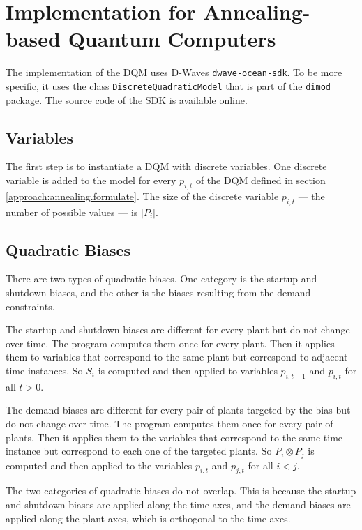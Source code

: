 \section{Implementation for Annealing-based Quantum Computers}

The implementation of the DQM uses D-Waves \texttt{dwave-ocean-sdk}.
\cite{OceanSDKDoc}
To be more specific, it uses the class \texttt{DiscreteQuadraticModel} that is part of the \texttt{dimod} package.
\cite{DQMDoc}
The source code of the SDK is available online.
\cite{OceanSDKGit}

\subsection*{Variables}

The first step is to instantiate a DQM with discrete variables.
One discrete variable is added to the model for every $p_{i, t}$ of the DQM defined in section \ref{approach:annealing.formulate}.
The size of the discrete variable $p_{i, t}$ --- the number of possible values --- is $| P_i |$.

\subsection*{Quadratic Biases}

There are two types of quadratic biases.
One category is the startup and shutdown biases, and the other is the biases resulting from the demand constraints.

The startup and shutdown biases are different for every plant but do not change over time.
The program computes them once for every plant.
Then it applies them to variables that correspond to the same plant but correspond to adjacent time instances.
So $S_i$ is computed and then applied to variables $p_{i, t-1}$ and $p_{i, t}$ for all $t > 0$.

The demand biases are different for every pair of plants targeted by the bias but do not change over time.
The program computes them once for every pair of plants.
Then it applies them to the variables that correspond to the same time instance but correspond to each one of the targeted plants.
So $P_i \otimes P_j$ is computed and then applied to the variables $p_{i, t}$ and $p_{j, t}$ for all $i < j$.

The two categories of quadratic biases do not overlap.
This is because the startup and shutdown biases are applied along the time axes,
and the demand biases are applied along the plant axes, which is orthogonal to the time axes.

